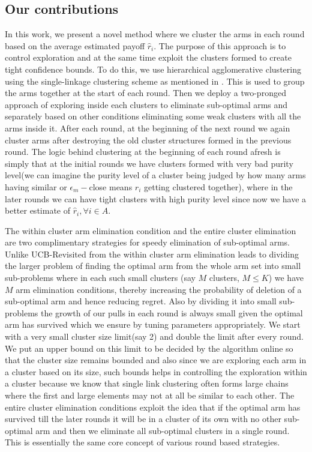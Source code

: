 \subsection*{Our contributions}
In this work, we present a novel method where we cluster the arms in each round based on the average estimated payoff $\hat{r}_{i}$. The purpose of this approach is to control exploration and at the same time exploit the clusters formed to create tight confidence bounds. To do this, we use hierarchical agglomerative clustering using the single-linkage clustering scheme as mentioned in \cite{friedman2001elements}. This is used to group the arms together at the start of each round. Then we deploy a two-pronged approach of exploring inside each clusters to eliminate sub-optimal arms and separately based on other conditions eliminating some weak clusters with all the arms inside it. After each round, at the beginning of the next round we again cluster arms after destroying the old cluster structures formed in the previous round. The logic behind clustering at the beginning of each round afresh is simply that at the initial rounds we have clusters formed with very bad purity level(we can imagine the purity level 
of a cluster being judged by how many arms having similar or $\epsilon_{m}-$close means $r_{i}$ getting clustered together), where in the later rounds we can have tight clusters with high purity level since now we have a better estimate of $\hat{r}_{i}, \forall i\in A$.

	The within cluster arm elimination condition and the entire cluster elimination are two complimentary strategies for speedy elimination of sub-optimal arms. Unlike UCB-Revisited from \cite{auer2010ucb} the within cluster arm elimination leads to dividing the larger problem of finding the optimal arm from the whole arm set into small sub-problems where in each such small clusters (say $M$ clusters, $M\leq K$) we have $M$ arm elimination conditions, thereby increasing the probability of deletion of a sub-optimal arm and hence reducing regret. Also by dividing it into small sub-problems the growth of our pulls in each round is always small given the optimal arm has survived which we ensure by tuning parameters appropriately.  We start with a very small cluster size limit(say 2) and double the limit after every round. We put an upper bound on this limit to be decided by the algorithm online so that the cluster size remains bounded and also since we are exploring each arm in a cluster based on its size, such 
bounds helps in controlling the exploration within a cluster because we know that single link clustering often forms large chains where the first and large elements may not at all be similar to each other. The entire cluster elimination conditions exploit the idea that if the optimal arm has survived till the later rounds it will be in a cluster of its own with no other sub-optimal arm and then we eliminate all sub-optimal clusters in a single round. This is essentially the same core concept of various round based strategies.
	

